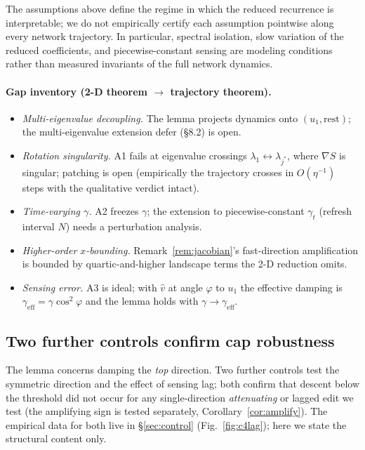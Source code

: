 The assumptions above define the regime in which the reduced
recurrence is interpretable; we do not empirically certify each
assumption pointwise along every network trajectory. In particular,
spectral isolation, slow variation of the reduced coefficients, and
piecewise-constant sensing are modeling conditions rather than
measured invariants of the full network dynamics.

\paragraph{Gap inventory (2-D theorem $\to$ trajectory theorem).}
\begin{itemize}
  \item[\textbf{G1}] \emph{Multi-eigenvalue decoupling.} The lemma
        projects dynamics onto $(u_{1},\mathrm{rest})$; the multi-eigenvalue
        extension \citet{damian2023selfstab} defer (\S8.2) is open.
  \item[\textbf{G2}] \emph{Rotation singularity.} A1 fails at eigenvalue
        crossings $\lambda_{1}\leftrightarrow\lambda_{j^{*}}$, where $\nabla S$
        is singular; patching is open (empirically the trajectory crosses in
        $O(\eta^{-1})$ steps with the qualitative verdict intact).
  \item[\textbf{G3}] \emph{Time-varying $\gamma$.} A2 freezes $\gamma$; the
        extension to piecewise-constant $\gamma_{t}$ (refresh interval $N$) needs
        a perturbation analysis.
  \item[\textbf{G4}] \emph{Higher-order $x$-bounding.} Remark~\ref{rem:jacobian}'s
        fast-direction amplification is bounded by quartic-and-higher landscape
        terms the 2-D reduction omits.
  \item[\textbf{G5}] \emph{Sensing error.} A3 is ideal; with $\hat v$ at angle
        $\varphi$ to $u_{1}$ the effective damping is
        $\gamma_{\mathrm{eff}}=\gamma\cos^{2}\varphi$ and the lemma holds
        with $\gamma\to\gamma_{\mathrm{eff}}$.
\end{itemize}

\subsection{Two further controls confirm cap robustness}
\label{app:two-controls}

The lemma concerns damping the \emph{top} direction. Two further controls
test the symmetric direction and the effect of sensing lag; both confirm that
descent below the threshold did not occur for any single-direction \emph{attenuating} or
lagged edit we test (the amplifying sign is tested separately,
Corollary~\ref{cor:amplify}). The
empirical data for both live in \S\ref{sec:control} (Fig.~\ref{fig:c4lag});
here we state the structural content only.

